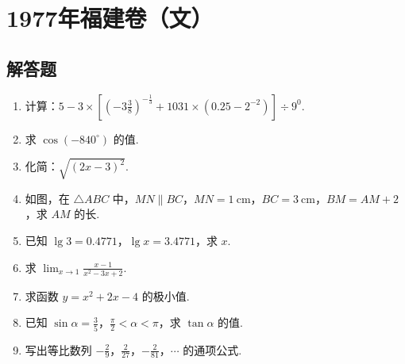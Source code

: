 \chapter{1977年福建卷（文）}

\section{解答题}

\begin{problem}
\begin{enumerate}
    \item 计算：\( 5-3\times\left[ \left( -3\frac{3}{8} \right)^{-\frac{1}{3}}+1031\times\left( 0.25-2^{-2} \right) \right]\div 9^0 \).

    \item 求 \( \cos\left( -840^\circ \right) \) 的值.

    \item 化简：\( \sqrt{\left( 2x-3 \right)^2} \).

    \item 如图，在 \( \triangle ABC\) 中，\( MN\parallel BC\)，\( MN=1\mathrm{~cm}\)，\( BC=3\mathrm{~cm}\)，\( BM=AM+2\)，求 \(AM\) 的长.

    \item 已知 \( \lg 3=0.4771 \)，\( \lg x=3.4771 \)，求 \( x \).

    \item 求 \( \displaystyle\lim_{x\to 1}\frac{x-1}{x^2-3x+2}\).

    \item 求函数 \( y=x^2+2x-4 \) 的极小值.

    \item 已知 \( \sin \alpha=\frac{3}{5} \)，\( \frac{\pi}{2}<\alpha<\pi \)，求 \( \tan \alpha \) 的值.

    \item 写出等比数列 \( -\frac{2}{9} \)，\( \frac{2}{27} \)，\( -\frac{2}{81} \)，\( \cdots \) 的通项公式.
\end{enumerate}


\end{problem}

